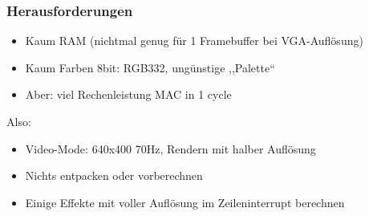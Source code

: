 \documentclass[t,14pt,aspectratio=169]{beamer}
\begin{document}
\begin{frame}
\frametitle{Herausforderungen}
\begin{itemize}
\item Kaum RAM {\small(nichtmal genug für 1 Framebuffer bei VGA-Auflösung)}
\item Kaum Farben {\small 8bit: RGB332, ungünstige ,,Palette``}

\item Aber: viel Rechenleistung {\small MAC in 1 cycle }
\end{itemize}
Also:
\begin{itemize}
\item Video-Mode: 640x400 70Hz, Rendern mit halber Auflösung
\item Nichts entpacken oder vorberechnen
\item Einige Effekte mit voller Auflösung im Zeileninterrupt berechnen
\end{itemize}
\end{frame}
\end{document}
